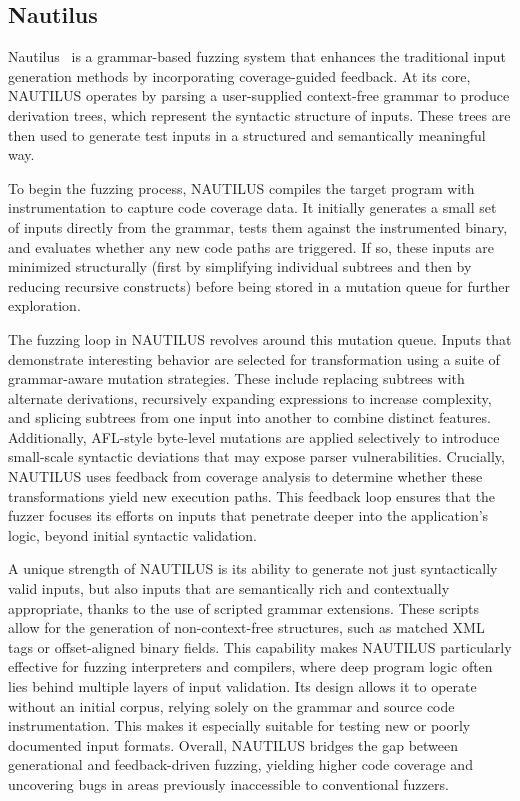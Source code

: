 \subsection{Nautilus}

Nautilus~\cite{nautilus} is a grammar-based fuzzing system that enhances the traditional input generation methods by incorporating coverage-guided feedback. 
At its core, NAUTILUS operates by parsing a user-supplied context-free grammar to produce derivation trees, which represent the syntactic structure of inputs. 
These trees are then used to generate test inputs in a structured and semantically meaningful way. 

To begin the fuzzing process, NAUTILUS compiles the target program with instrumentation to capture code coverage data. 
It initially generates a small set of inputs directly from the grammar, tests them against the instrumented binary, and evaluates whether any new code paths are triggered. 
If so, these inputs are minimized structurally (first by simplifying individual subtrees and then by reducing recursive constructs) before being stored in a mutation queue for further exploration.

The fuzzing loop in NAUTILUS revolves around this mutation queue. 
Inputs that demonstrate interesting behavior are selected for transformation using a suite of grammar-aware mutation strategies. 
These include replacing subtrees with alternate derivations, recursively expanding expressions to increase complexity, and splicing subtrees from one input into another to combine distinct features. 
Additionally, AFL-style byte-level mutations are applied selectively to introduce small-scale syntactic deviations that may expose parser vulnerabilities. 
Crucially, NAUTILUS uses feedback from coverage analysis to determine whether these transformations yield new execution paths. 
This feedback loop ensures that the fuzzer focuses its efforts on inputs that penetrate deeper into the application’s logic, beyond initial syntactic validation.

A unique strength of NAUTILUS is its ability to generate not just syntactically valid inputs, but also inputs that are semantically rich and contextually appropriate, thanks to the use of scripted grammar extensions. 
These scripts allow for the generation of non-context-free structures, such as matched XML tags or offset-aligned binary fields. 
This capability makes NAUTILUS particularly effective for fuzzing interpreters and compilers, where deep program logic often lies behind multiple layers of input validation. 
Its design allows it to operate without an initial corpus, relying solely on the grammar and source code instrumentation. 
This makes it especially suitable for testing new or poorly documented input formats. 
Overall, NAUTILUS bridges the gap between generational and feedback-driven fuzzing, yielding higher code coverage and uncovering bugs in areas previously inaccessible to conventional fuzzers.

